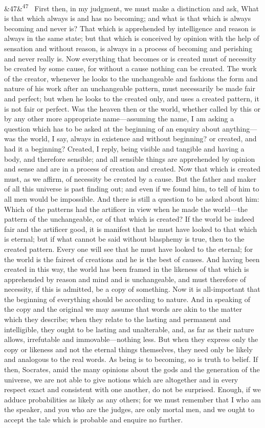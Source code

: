 \documentclass[12pt]{article}
\newcommand{\para}[1][]{\par\noindent\ifx&#1&\else\textsuperscript{\footnotesize #1}~\fi}
\begin{document}
\para[47] First then, in my judgment, we must make a distinction and ask, What is that which always is and has no becoming; and what is that which is always becoming and never is? That which is apprehended by intelligence and reason is always in the same state; but that which is conceived by opinion with the help of sensation and without reason, is always in a process of becoming and perishing and never really is. Now everything that becomes or is created must of necessity be created by some cause, for without a cause nothing can be created. The work of the creator, whenever he looks to the unchangeable and fashions the form and nature of his work after an unchangeable pattern, must necessarily be made fair and perfect; but when he looks to the created only, and uses a created pattern, it is not fair or perfect. Was the heaven then or the world, whether called by this or by any other more appropriate name---assuming the name, I am asking a question which has to be asked at the beginning of an enquiry about anything---was the world, I say, always in existence and without beginning? or created, and had it a beginning? Created, I reply, being visible and tangible and having a body, and therefore sensible; and all sensible things are apprehended by opinion and sense and are in a process of creation and created. Now that which is created must, as we affirm, of necessity be created by a cause. But the father and maker of all this universe is past finding out; and even if we found him, to tell of him to all men would be impossible. And there is still a question to be asked about him: Which of the patterns had the artificer in view when he made the world---the pattern of the unchangeable, or of that which is created? If the world be indeed fair and the artificer good, it is manifest that he must have looked to that which is eternal; but if what cannot be said without blasphemy is true, then to the created pattern. Every one will see that he must have looked to the eternal; for the world is the fairest of creations and he is the best of causes. And having been created in this way, the world has been framed in the likeness of that which is apprehended by reason and mind and is unchangeable, and must therefore of necessity, if this is admitted, be a copy of something. Now it is all-important that the beginning of everything should be according to nature. And in speaking of the copy and the original we may assume that words are akin to the matter which they describe; when they relate to the lasting and permanent and intelligible, they ought to be lasting and unalterable, and, as far as their nature allows, irrefutable and immovable---nothing less. But when they express only the copy or likeness and not the eternal things themselves, they need only be likely and analogous to the real words. As being is to becoming, so is truth to belief. If then, Socrates, amid the many opinions about the gods and the generation of the universe, we are not able to give notions which are altogether and in every respect exact and consistent with one another, do not be surprised. Enough, if we adduce probabilities as likely as any others; for we must remember that I who am the speaker, and you who are the judges, are only mortal men, and we ought to accept the tale which is probable and enquire no further.
\end{document}
